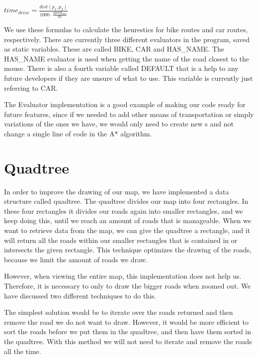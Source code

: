 \begin{center}
$
time_{drive}=\frac{dist(p_{1},p_{2})}{1000\cdot \frac {speed_{max}}{60}}
$
\end{center}

We use these formulas to calculate the heurestics for bike routes and car routes, respectively.
There are currently three different evaluators in the program, saved as static variables. These
are called BIKE, CAR and HAS\_NAME. The HAS\_NAME evaluator is used when getting
the name of the road closest to the mouse. There is also a fourth variable called DEFAULT that 
is a help to any future developers if they are unsure of what to use. This variable is currently just 
referring to CAR. 

The Evaluator implementation is a good example of making our code ready for future features, 
since if we needed to add other means of transportation or simply variations of the ones 
we have, we would only need to create new s and not change 
a single line of code in the A* algorithm.

\section{Quadtree}
\label{IMPL-QT}
In order to improve the drawing of our map, we have implemented a data structure
called quadtree. The quadtree divides our map into four rectangles. In these four rectangles 
it divides our roads again into smaller rectangles, and we keep doing this, until we reach
an amount of roads that is manageable.
When we want to retrieve data from the map, we can give the quadtree a
rectangle, and it will return all the roads within our smaller rectangles that is contained in 
or intersects the given rectangle. This technique optimizes the drawing of the roads, because we
limit the amount of roads we draw.

However, when viewing the entire map, this implementation does not help
us. Therefore, it is necessary to only to draw the bigger roads when zoomed out. We
have discussed two different techniques to do this.

The simplest solution would be to iterate over the roads returned and then
remove the road we do not want to draw. However, it would be more efficient to sort the
roads before we put them in the quadtree, and then have them sorted in the quadtree.
With this method we will not need to iterate and remove the roads all the time.

